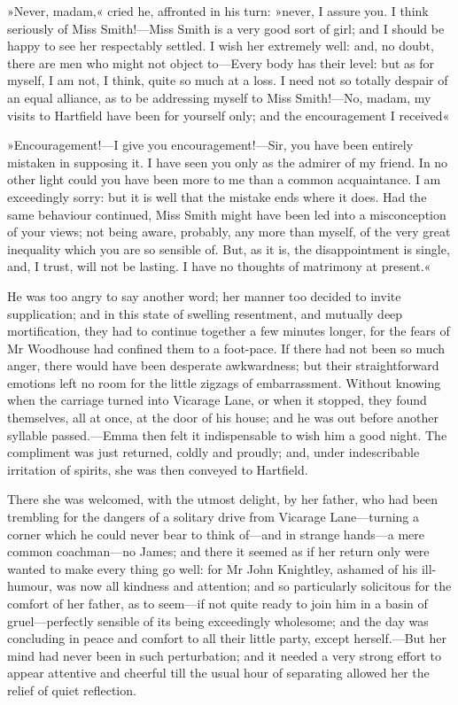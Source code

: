 »Never, madam,« cried he, affronted in his turn: »never, I assure you. I think seriously of Miss Smith!—Miss Smith is a very good sort of girl; and I should be happy to see her respectably settled. I wish her extremely well: and, no doubt, there are men who might not object to—Every body has their level: but as for myself, I am not, I think, quite so much at a loss. I need not so totally despair of an equal alliance, as to be addressing myself to Miss Smith!—No, madam, my visits to Hartfield have been for yourself only; and the encouragement I received\longdash«

»Encouragement!—I give you encouragement!—Sir, you have been entirely mistaken in supposing it. I have seen you only as the admirer of my friend. In no other light could you have been more to me than a common acquaintance. I am exceedingly sorry: but it is well that the mistake ends where it does. Had the same behaviour continued, Miss Smith might have been led into a misconception of your views; not being aware, probably, any more than myself, of the very great inequality which you are so sensible of. But, as it is, the disappointment is single, and, I trust, will not be lasting. I have no thoughts of matrimony at present.«

He was too angry to say another word; her manner too decided to invite supplication; and in this state of swelling resentment, and mutually deep mortification, they had to continue together a few minutes longer, for the fears of Mr Woodhouse had confined them to a foot-pace. If there had not been so much anger, there would have been desperate awkwardness; but their straightforward emotions left no room for the little zigzags of embarrassment. Without knowing when the carriage turned into Vicarage Lane, or when it stopped, they found themselves, all at once, at the door of his house; and he was out before another syllable passed.—Emma then felt it indispensable to wish him a good night. The compliment was just returned, coldly and proudly; and, under indescribable irritation of spirits, she was then conveyed to Hartfield.

There she was welcomed, with the utmost delight, by her father, who had been trembling for the dangers of a solitary drive from Vicarage Lane—turning a corner which he could never bear to think of—and in strange hands—a mere common coachman—no James; and there it seemed as if her return only were wanted to make every thing go well: for Mr John Knightley, ashamed of his ill-humour, was now all kindness and attention; and so particularly solicitous for the comfort of her father, as to seem—if not quite ready to join him in a basin of gruel—perfectly sensible of its being exceedingly wholesome; and the day was concluding in peace and comfort to all their little party, except herself.—But her mind had never been in such perturbation; and it needed a very strong effort to appear attentive and cheerful till the usual hour of separating allowed her the relief of quiet reflection.